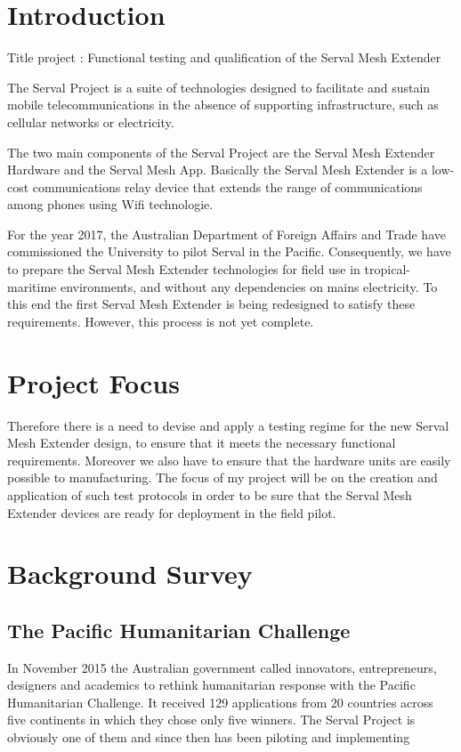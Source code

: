 \documentclass[a4paper, 11pt, oneside]{Thesis}  %
\begin{document}
\section{Introduction}
Title project : \Large Functional testing and qualification of the Serval Mesh Extender
\normalsize \par
The Serval Project is a suite of technologies designed to facilitate and sustain mobile telecommunications in the absence of supporting infrastructure, such as cellular networks or electricity. \par The two main components of the Serval Project are the Serval Mesh Extender Hardware and the Serval Mesh App. Basically the Serval Mesh Extender is a low-cost communications relay device that extends the range of communications among phones using Wifi technologie. 

For the year 2017, the Australian Department of Foreign Affairs and Trade have commissioned the University to pilot Serval in the Pacific. Consequently, we have to prepare the Serval Mesh Extender technologies for field use in tropical-maritime environments, and without any dependencies on mains electricity. To this end the first Serval Mesh Extender is being redesigned to satisfy these requirements. However, this process is not yet complete. \par

\section{Project Focus}

Therefore there is a need to devise and apply a testing regime for the new Serval Mesh Extender design, to ensure that it meets the necessary functional requirements. Moreover we also have to ensure that the hardware units are easily possible to manufacturing. The focus of my project will be on the creation and application of such test protocols in order to be sure that the Serval Mesh Extender devices are ready for deployment in the field pilot. 

\section{Background Survey}
\subsection{The Pacific Humanitarian Challenge}

In November 2015 the Australian government called innovators, entrepreneurs, designers and academics to rethink humanitarian response with the Pacific Humanitarian Challenge. It received 129 applications from 20 countries across five continents in which they chose only five winners. The Serval Project is obviously one of them and since then has been piloting and implementing
\end{document}
